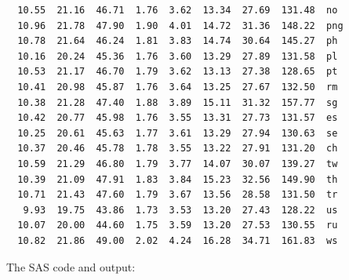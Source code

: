 \documentclass{article}
\begin{document}
\begin{verbatim}
  10.55  21.16  46.71  1.76  3.62  13.34  27.69  131.48  no 
  10.96  21.78  47.90  1.90  4.01  14.72  31.36  148.22  png
  10.78  21.64  46.24  1.81  3.83  14.74  30.64  145.27  ph 
  10.16  20.24  45.36  1.76  3.60  13.29  27.89  131.58  pl 
  10.53  21.17  46.70  1.79  3.62  13.13  27.38  128.65  pt 
  10.41  20.98  45.87  1.76  3.64  13.25  27.67  132.50  rm 
  10.38  21.28  47.40  1.88  3.89  15.11  31.32  157.77  sg 
  10.42  20.77  45.98  1.76  3.55  13.31  27.73  131.57  es 
  10.25  20.61  45.63  1.77  3.61  13.29  27.94  130.63  se 
  10.37  20.46  45.78  1.78  3.55  13.22  27.91  131.20  ch 
  10.59  21.29  46.80  1.79  3.77  14.07  30.07  139.27  tw 
  10.39  21.09  47.91  1.83  3.84  15.23  32.56  149.90  th 
  10.71  21.43  47.60  1.79  3.67  13.56  28.58  131.50  tr 
   9.93  19.75  43.86  1.73  3.53  13.20  27.43  128.22  us 
  10.07  20.00  44.60  1.75  3.59  13.20  27.53  130.55  ru 
  10.82  21.86  49.00  2.02  4.24  16.28  34.71  161.83  ws 
\end{verbatim}
The SAS code and output:
\end{document}
